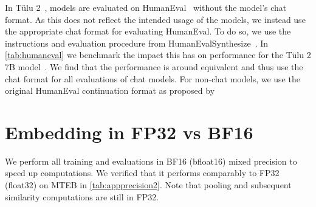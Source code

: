\documentclass{article}
\newcommand{\tulu}{T\"ulu}
\begin{document}
In \tulu{} 2~\cite{ivison2023camels}, models are evaluated on HumanEval~\cite{chen2021evaluating} without the model's chat format. As this does not reflect the intended usage of the models, we instead use the appropriate chat format for evaluating HumanEval. To do so, we use the instructions and evaluation procedure from HumanEvalSynthesize~\cite{muennighoff2023octopack}. In \autoref{tab:humaneval} we benchmark the impact this has on performance for the \tulu{} 2 7B model~\cite{ivison2023camels}. We find that the performance is around equivalent and thus use the chat format for all evaluations of chat models. For non-chat models, we use the original HumanEval continuation format as proposed by~\citet{chen2021evaluating}

\FloatBarrier

\section{Embedding in FP32 vs BF16}
\label{sec:precision}

We perform all training and evaluations in BF16 (bfloat16) mixed precision to speed up computations. We verified that it performs comparably to FP32 (float32) on MTEB in \autoref{tab:appprecision2}. Note that pooling and subsequent similarity computations are still in FP32.

\begin{table}[htbp]
\centering
\caption{\textbf{Embeddings in FP32 vs BF16.} Benchmarking of the raw Mistral 7B model. ``FP32'' corresponds to doing all computations in float32 precision. ``BF16'' and ``BF16 Cache'' corresponds to doing most operations in bfloat16 except for operations that PyTorch auto casts to float32 (e.g. normalization), pooling and similarity computations. For ``BF16 Cache'', we cast the embeddings after pooling to BF16 and then back to FP32 before similarity computations. This corresponds to locally caching the embeddings in BF16 to save storage and then casting them to FP32 at inference.}
\end{table}
\end{document}
